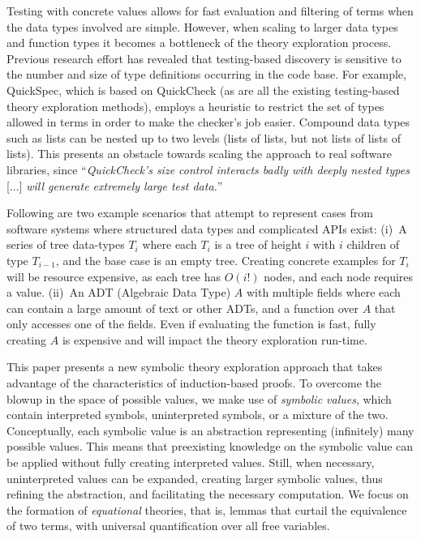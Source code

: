 Testing with concrete values allows for fast evaluation and filtering of terms when the data types involved are simple.
However, when scaling to larger data types and function types it becomes a bottleneck of the theory exploration process.
Previous research effort has revealed that testing-based discovery is sensitive to the number and size of type definitions occurring in the code base.
For example, QuickSpec, which is based on QuickCheck (as are all the existing testing-based theory exploration methods), employs a heuristic to restrict the set of types allowed in terms in order to make the checker's job easier.
Compound data types such as lists can be nested up to two levels (lists of lists, but not lists of lists of lists).
This presents an obstacle towards scaling the approach to real software libraries, since ``\textit{QuickCheck's size control
interacts badly with deeply nested types} [...] \textit{will generate extremely large test data.}''~\cite{JFP2017:Smallbonequickspec2}

Following are two example scenarios that attempt to represent cases from software systems where structured data types and complicated APIs exist:
(i)~A series of tree data-types $T_i$ where each $T_i$ is a tree of height $i$ with $i$ children of type $T_{i-1}$, and the base case is an empty tree.
Creating concrete examples for $T_i$ will be resource expensive, as each tree has $O(i!)$ nodes, and each node requires a value.
(ii)~An ADT (Algebraic Data Type) $A$ with multiple fields where each can contain a large amount of text or other ADTs, and a function over $A$ that only accesses one of the fields.
Even if evaluating the function is fast, fully creating $A$ is expensive and will impact the theory exploration run-time.

This paper presents a new symbolic theory exploration approach that takes advantage of the characteristics of induction-based proofs.
To overcome the blowup in the space of possible values, we make use of \emph{symbolic values}, which contain interpreted symbols, uninterpreted symbols, or a mixture of the two. 
Conceptually, each symbolic value is an abstraction representing (infinitely) many possible values. 
This means that preexisting knowledge on the symbolic value can be applied without fully creating interpreted values.
Still, when necessary, uninterpreted values can be expanded, creating larger symbolic values, thus refining the abstraction, and facilitating the necessary computation.
We focus on the formation of \emph{equational} theories, that is, lemmas that curtail the equivalence of two terms, with universal quantification over all free variables.

